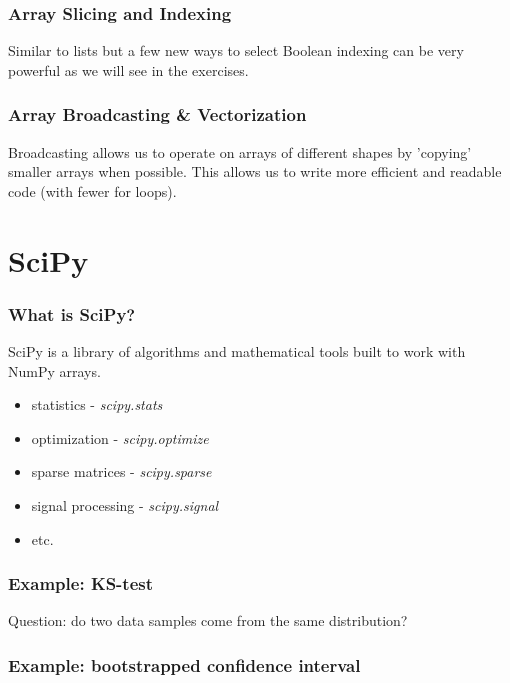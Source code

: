 \documentclass{beamer}
\begin{document}
\begin{frame}
\frametitle{Array Slicing and Indexing}
Similar to lists but a few new ways to select
Boolean indexing can be very powerful as we will see in the exercises.
\end{frame}

\begin{frame}
\frametitle{Array Broadcasting \& Vectorization}
Broadcasting allows us to operate on arrays of different shapes by 'copying' smaller arrays when possible. This allows us to write more efficient and readable code (with fewer for loops).
\end{frame}


\section{SciPy}

\begin{frame}
\frametitle{What is SciPy?}
SciPy is a library of algorithms and mathematical tools built to work with NumPy arrays.
\vspace{0.2in}
\begin{itemize}
\setlength{\itemsep}{0.1in}
\item{statistics - \textit{scipy.stats}}
\item{optimization - \textit{scipy.optimize}}
\item{sparse matrices - \textit{scipy.sparse}}
\item{signal processing - \textit{scipy.signal}}
\item{etc.}
\end{itemize}
\end{frame}


\begin{frame}
\frametitle{Example: KS-test}
Question: do two data samples come from the same distribution?
\end{frame}

\begin{frame}
\frametitle{Example: bootstrapped confidence interval}
\end{frame}

\end{document}
